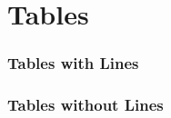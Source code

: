 \section{Tables}
    \begin{frame}
        \frametitle{Tables with Lines}
    \end{frame}

    \begin{frame}
        \frametitle{Tables without Lines}
    \end{frame}